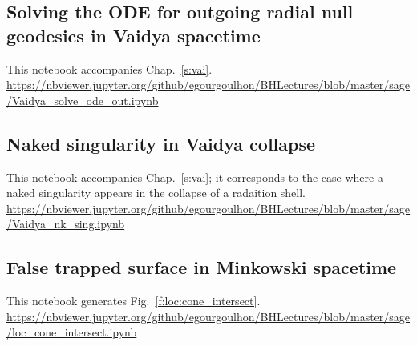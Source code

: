 \subsection{Solving the ODE for outgoing radial null geodesics in Vaidya spacetime} \label{s:sam:Vaidya_solve_ode_out}

This notebook accompanies Chap.~\ref{s:vai}. \\[1ex]
{\footnotesize
\url{https://nbviewer.jupyter.org/github/egourgoulhon/BHLectures/blob/master/sage/Vaidya_solve_ode_out.ipynb}
}

\subsection{Naked singularity in Vaidya collapse} \label{s:sam:Vaidya_nk_sing}

This notebook accompanies Chap.~\ref{s:vai}; it corresponds to the case where a
naked singularity appears in the collapse of a radaition shell. \\[1ex]
{\footnotesize
\url{https://nbviewer.jupyter.org/github/egourgoulhon/BHLectures/blob/master/sage/Vaidya_nk_sing.ipynb}
}

\subsection{False trapped surface in Minkowski spacetime} \label{s:sam:loc_cone_intersect}

This notebook generates Fig.~\ref{f:loc:cone_intersect}. \\[1ex]
{\footnotesize
\url{https://nbviewer.jupyter.org/github/egourgoulhon/BHLectures/blob/master/sage/loc_cone_intersect.ipynb}
}


